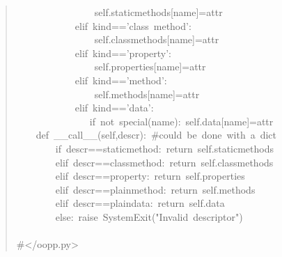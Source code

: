 \documentclass[10pt,english]{article}
\begin{document}
\begin{quote}
\begin{ttfamily}
\begin{flushleft}
\mbox{~~~~~~~~~~~~~~~~self.staticmethods[name]=attr}\\
\mbox{~~~~~~~~~~~~elif~kind=='class~method':}\\
\mbox{~~~~~~~~~~~~~~~~self.classmethods[name]=attr}\\
\mbox{~~~~~~~~~~~~elif~kind=='property':}\\
\mbox{~~~~~~~~~~~~~~~~self.properties[name]=attr}\\
\mbox{~~~~~~~~~~~~elif~kind=='method':}\\
\mbox{~~~~~~~~~~~~~~~~self.methods[name]=attr}\\
\mbox{~~~~~~~~~~~~elif~kind=='data':}\\
\mbox{~~~~~~~~~~~~~~~if~not~special(name):~self.data[name]=attr}\\
\mbox{~~~~def~{\_}{\_}call{\_}{\_}(self,descr):~{\#}could~be~done~with~a~dict}\\
\mbox{~~~~~~~~if~descr==staticmethod:~return~self.staticmethods~}\\
\mbox{~~~~~~~~elif~descr==classmethod:~return~self.classmethods}\\
\mbox{~~~~~~~~elif~descr==property:~return~self.properties~}\\
\mbox{~~~~~~~~elif~descr==plainmethod:~return~self.methods}\\
\mbox{~~~~~~~~elif~descr==plaindata:~return~self.data}\\
\mbox{~~~~~~~~else:~raise~SystemExit("Invalid~descriptor")}\\
\mbox{}\\
\mbox{{\#}</oopp.py>}
\end{flushleft}\end{ttfamily}
\end{quote}
\end{document}
